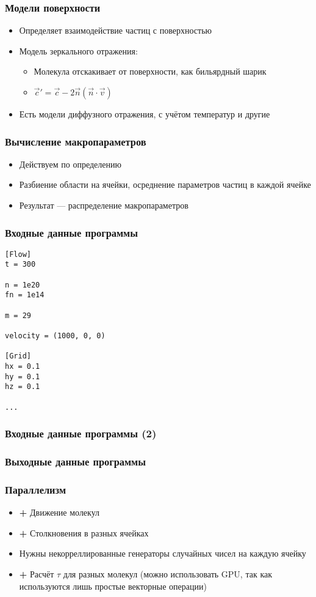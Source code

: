 \documentclass[onlymath]{beamer}
\newcommand\good{{\color{green!50!black} \textbf{+}}}
\begin{document}
\begin{frame}
  \frametitle{Модели поверхности}
  \begin{itemize}
  \item Определяет взаимодействие частиц с поверхностью
  \item Модель зеркального отражения:
    \begin{itemize}
    \item Молекула отскакивает от поверхности, как бильярдный шарик
    \item $\vec{c}' = \vec{c} - 2\vec{n}(\vec{n} \cdot\vec{v})$
    \end{itemize}
  \item Есть модели диффузного отражения, с учётом температур и другие
  \end{itemize}
\end{frame}

\begin{frame}
  \frametitle{Вычисление макропараметров}
  \begin{itemize}
  \item Действуем по определению
  \item Разбиение области на ячейки, осреднение параметров частиц в
    каждой ячейке
  \item Результат — распределение макропараметров
  \end{itemize}
\end{frame}

\begin{frame}
  \frametitle{Входные данные программы}
\begin{lstlisting}
[Flow]
t = 300

n = 1e20
fn = 1e14

m = 29

velocity = (1000, 0, 0)

[Grid]
hx = 0.1
hy = 0.1
hz = 0.1

...
\end{lstlisting}
\end{frame}

\begin{frame}
  \frametitle{Входные данные программы (2)}
  
\end{frame}

\begin{frame}
  \frametitle{Выходные данные программы}
  
\end{frame}

\begin{frame}
  \frametitle{Параллелизм}
  \begin{itemize}
  \item \good{} Движение молекул
  \item \good{} Столкновения в разных ячейках
  \item Нужны некорреллированные генераторы случайных чисел на каждую ячейку
  \item \good{} Расчёт $\tau$ для разных молекул (можно использовать
    GPU, так как используются лишь простые векторные операции)
  \end{itemize}
\end{frame}
\end{document}
